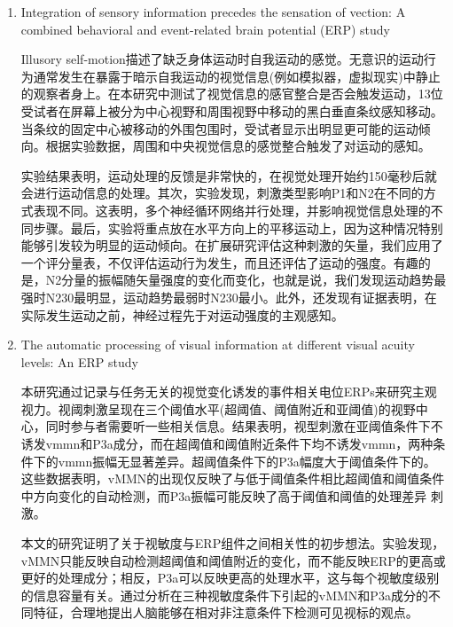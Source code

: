 \documentclass{hitreport}
\begin{document}
\begin{enumerate}
\item Integration of sensory information precedes the sensation of vection: A combined behavioral and event-related brain potential (ERP) study\cite{Keshavarz2014}

\hspace{2em}Illusory self-motion描述了缺乏身体运动时自我运动的感觉。无意识的运动行为通常发生在暴露于暗示自我运动的视觉信息(例如模拟器，虚拟现实)中静止的观察者身上。在本研究中测试了视觉信息的感官整合是否会触发运动，13位受试者在屏幕上被分为中心视野和周围视野中移动的黑白垂直条纹感知移动。当条纹的固定中心被移动的外围包围时，受试者显示出明显更可能的运动倾向。根据实验数据，周围和中央视觉信息的感觉整合触发了对运动的感知。

\hspace{2em}实验结果表明，运动处理的反馈是非常快的，在视觉处理开始约150毫秒后就会进行运动信息的处理。其次，实验发现，刺激类型影响P1和N2在不同的方式表现不同。这表明，多个神经循环网络并行处理，并影响视觉信息处理的不同步骤。最后，实验将重点放在水平方向上的平移运动上，因为这种情况特别能够引发较为明显的运动倾向。在扩展研究评估这种刺激的矢量，我们应用了一个评分量表，不仅评估运动行为发生，而且还评估了运动的强度。有趣的是，N2分量的振幅随矢量强度的变化而变化，也就是说，我们发现运动趋势最强时N230最明显，运动趋势最弱时N230最小。此外，还发现有证据表明，在实际发生运动之前，神经过程先于对运动强度的主观感知。

\item The automatic processing of visual information at different visual acuity levels: An ERP study\cite{Meng2015}

\hspace{2em}本研究通过记录与任务无关的视觉变化诱发的事件相关电位ERPs来研究主观视力。视阈刺激呈现在三个阈值水平(超阈值、阈值附近和亚阈值)的视野中心，同时参与者需要听一些相关信息。结果表明，视型刺激在亚阈值条件下不诱发vmmn和P3a成分，而在超阈值和阈值附近条件下均不诱发vmmn，两种条件下的vmmn振幅无显著差异。超阈值条件下的P3a幅度大于阈值条件下的。 这些数据表明，vMMN的出现仅反映了与低于阈值条件相比超阈值和阈值条件中方向变化的自动检测，而P3a振幅可能反映了高于阈值和阈值的处理差异 刺激。

\hspace{2em}本文的研究证明了关于视敏度与ERP组件之间相关性的初步想法。实验发现，vMMN只能反映自动检测超阈值和阈值附近的变化，而不能反映ERP的更高或更好的处理成分；相反，P3a可以反映更高的处理水平，这与每个视敏度级别的信息容量有关。通过分析在三种视敏度条件下引起的vMMN和P3a成分的不同特征，合理地提出人脑能够在相对非注意条件下检测可见视标的观点。


\end{enumerate}
\end{document}
